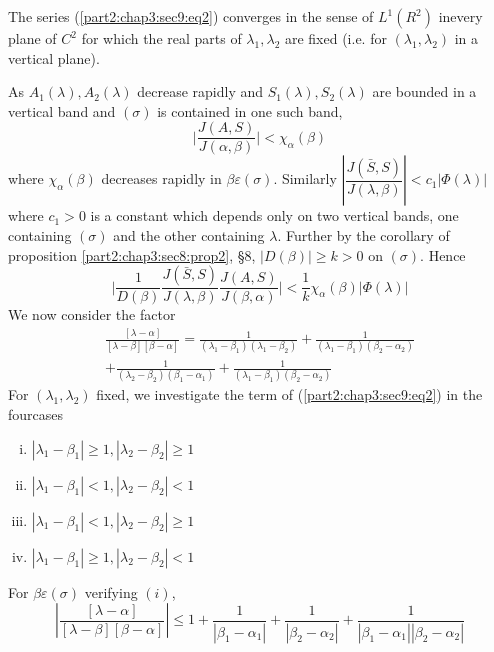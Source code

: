 \setcounter{proposition}{0}
\begin{proposition}\label{part2:chap3:sec9:prop1}%
  The series (\ref{part2:chap3:sec9:eq2}) converges in the sense of $L^1(R^2)$ in\pageoriginale every plane
  of $C^2$ for which the real parts of $\lambda_1, \lambda_2$ are
  fixed (i.e. for $(\lambda_1, \lambda_2)$ in a vertical plane). 
\end{proposition}

As $A_1(\lambda),A_2(\lambda)$ decrease rapidly and
$S_1(\lambda),S_2(\lambda)$ are bounded in a vertical band and
$(\sigma)$ is contained in one such band, 
$$
\big |\frac{J(A,S)}{J(\alpha, \beta)}\big |< \chi_\alpha (\beta)
$$
where $\chi_\alpha (\beta)$ decreases rapidly in $\beta \varepsilon 
(\sigma)$. Similarly $|\dfrac{J(\bar{S},S)}{J(\lambda, \beta)}|< c_1
|\Phi(\lambda)|$ where $c_1 >0$ is a constant which depends only on
two vertical bands, one containing $(\sigma)$ and the other containing
$\lambda$. Further by the corollary of
proposition \ref{part2:chap3:sec8:prop2}, \S 8, $|D(\beta)|\geq k>0$
on $(\sigma)$. Hence  
$$
\bigg|\frac{1}{D(\beta)}\frac{J(\bar{S},S)}{J(\lambda,
  \beta)}\frac{J(A,S)}{J(\beta,\alpha)}\bigg|< \frac{1}{k} \chi_\alpha
(\beta)|\Phi (\lambda)| 
$$
We now consider the factor
\begin{multline*}
  \frac{[\lambda- \alpha]}{[\lambda-
      \beta][\beta-\alpha]} =
  \frac{1}{(\lambda_1-\beta_1)(\lambda_1-\beta_2)} +
  \frac{1}{(\lambda_1-\beta_1)(\beta_2-\alpha_2)}\\
  +\frac{1}{(\lambda_2-\beta_2)(\beta_1-\alpha_1)}
  +\frac{1}{(\lambda_1-\beta_1)(\beta_2-\alpha_2)}  
  \tag{3}\label{part2:chap3:sec9:eq3} 
\end{multline*}
For $(\lambda_1,\lambda_2)$ fixed, we investigate the term of
(\ref{part2:chap3:sec9:eq2})
in the four\pageoriginale cases 
\begin{enumerate}[i)]
\item $|\lambda_1-\beta_1|\geq 1, |\lambda_2-\beta_2|\geq 1$

\item $|\lambda_1-\beta_1|< 1, |\lambda_2-\beta_2|< 1$

\item $|\lambda_1-\beta_1|< 1, |\lambda_2-\beta_2|\geq 1$

\item $|\lambda_1-\beta_1|\geq 1, |\lambda_2-\beta_2|< 1$
\end{enumerate}
For $\beta \varepsilon  (\sigma)$ verifying $(i)$,
$$
|\frac{[\lambda- \alpha]}{[\lambda- \beta][\beta-\alpha]}|\leq 1+
\frac{1}{|\beta_1 -\alpha_1|}+\frac{1}{|\beta_2
  -\alpha_2|}+\frac{1}{|\beta_1 -\alpha_1||\beta_2-\alpha_2|} 
$$

